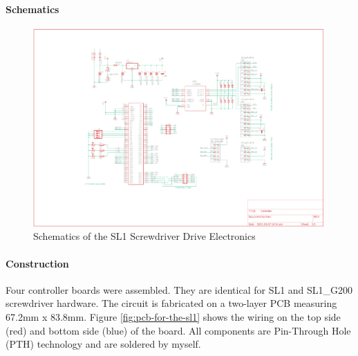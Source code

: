 \paragraph{Schematics}

\begin{figure}[!h]
    \centering
    \includegraphics[width=0.99\textwidth]{images/7a/img63.png}
    \caption{Schematics of the SL1 Screwdriver Drive Electronics}
    \label{fig:schematics-of-the-sl1-screwdriver-electronics}
\end{figure}


\paragraph{Construction}
Four controller boards were assembled. They are identical for SL1 and SL1\_G200 screwdriver hardware. The circuit is fabricated on a two-layer PCB measuring 67.2mm x 83.8mm. Figure \ref{fig:pcb-for-the-sl1} shows the wiring on the top side (red) and bottom side (blue) of the board. All components are Pin-Through Hole (PTH) technology and are soldered by myself.

